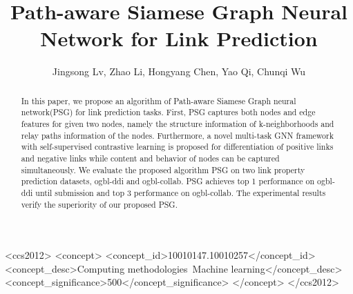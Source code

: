 \documentclass[sigconf]{acmart}
\begin{document}
\title{Path-aware Siamese Graph Neural Network for Link Prediction}

\author{Jingsong Lv, Zhao Li, Hongyang Chen, Yao Qi, Chunqi Wu}

\renewcommand{\shortauthors}{Jingsong Lv, et al.}


\begin{abstract}
  In this paper, we propose an algorithm of Path-aware Siamese Graph neural network(PSG) for link prediction tasks. First, PSG captures both nodes and edge features for given two nodes, namely the structure information of k-neighborhoods and relay paths information of the nodes. Furthermore, a novel multi-task GNN framework with self-supervised contrastive learning is proposed for differentiation of positive links and negative links while content and behavior of nodes can be captured simultaneously. We evaluate the proposed algorithm PSG  on two link property prediction datasets, ogbl-ddi and ogbl-collab. PSG achieves top 1 performance on ogbl-ddi until submission and top 3 performance on ogbl-collab. The experimental results verify the superiority of our proposed PSG.
\end{abstract}


\begin{CCSXML}
<ccs2012>
   <concept>
       <concept_id>10010147.10010257</concept_id>
       <concept_desc>Computing methodologies~Machine learning</concept_desc>
       <concept_significance>500</concept_significance>
       </concept>
 </ccs2012>
\end{CCSXML}



\maketitle
\end{document}
